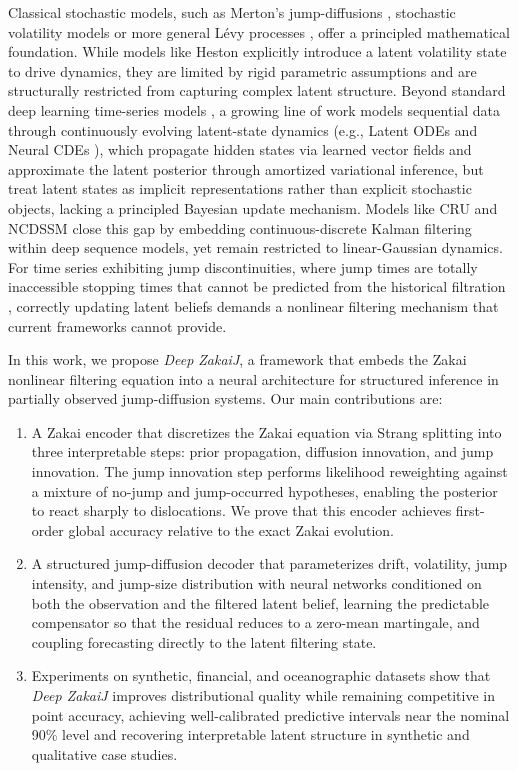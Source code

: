 \documentclass{article}
\begin{document}
Classical stochastic models, such as Merton’s jump-diffusions \citep{merton1976option}, stochastic volatility models \citep{heston1993closed} or more general L\'evy processes \citep{bertoin1996levy}, offer a principled mathematical foundation. While models like Heston explicitly introduce a latent volatility state to drive dynamics, they are limited by rigid parametric assumptions and are structurally restricted from capturing complex latent structure. Beyond standard deep learning time-series models \citep{yu2019review, benidis2022deep, lim2021time}, a growing line of work models sequential data through continuously evolving latent-state dynamics (e.g., Latent ODEs \citep{rubanova2019latent} and Neural CDEs \citep{kidger2020neural}), which propagate hidden states via learned vector fields and approximate the latent posterior through amortized variational inference, but treat latent states as implicit representations rather than explicit stochastic objects, lacking a principled Bayesian update mechanism. Models like CRU \citep{schirmer2022modeling} and NCDSSM \citep{ansari2023neural} close this gap by embedding continuous-discrete Kalman filtering within deep sequence models, yet remain restricted to linear-Gaussian dynamics. For time series exhibiting jump discontinuities, where jump times are totally inaccessible stopping times that cannot be predicted from the historical filtration \citep{protter2012stochastic, ankirchner2008filtration}, correctly updating latent beliefs demands a nonlinear filtering mechanism that current frameworks cannot provide.


In this work, we propose \textit{Deep ZakaiJ}, a framework that embeds the Zakai nonlinear filtering equation into a neural architecture for structured inference in partially observed jump-diffusion systems. Our main contributions are:
\begin{enumerate}
\item[(i)] A Zakai encoder that discretizes the Zakai equation via Strang splitting into three interpretable steps: prior propagation, diffusion innovation, and jump innovation. The jump innovation step performs likelihood reweighting against a mixture of no-jump and jump-occurred hypotheses, enabling the posterior to react sharply to dislocations. We prove that this encoder achieves first-order global accuracy relative to the exact Zakai evolution.
\item[(ii)] A structured jump-diffusion decoder that parameterizes drift, volatility, jump intensity, and jump-size distribution with neural networks conditioned on both the observation and the filtered latent belief, learning the predictable compensator so that the residual reduces to a zero-mean martingale, and coupling forecasting directly to the latent filtering state.
\item[(iii)] Experiments on synthetic, financial, and oceanographic datasets show that \textit{Deep ZakaiJ} improves distributional quality while remaining competitive in point accuracy, achieving well-calibrated predictive intervals near the nominal 90\% level and recovering interpretable latent structure in synthetic and qualitative case studies.
\end{enumerate}
\end{document}
